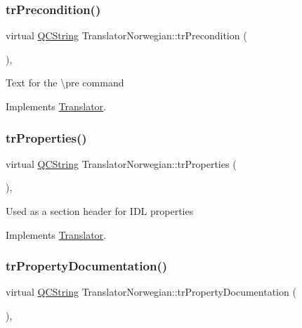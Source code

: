 \subsubsection{\texorpdfstring{trPrecondition()}{trPrecondition()}}
{\footnotesize\ttfamily virtual \mbox{\hyperlink{class_q_c_string}{Q\+C\+String}} Translator\+Norwegian\+::tr\+Precondition (\begin{DoxyParamCaption}{ }\end{DoxyParamCaption})\hspace{0.3cm}{\ttfamily [inline]}, {\ttfamily [virtual]}}

Text for the \textbackslash{}pre command 

Implements \mbox{\hyperlink{class_translator}{Translator}}.

\mbox{\label{class_translator_norwegian_aa2d4c267e5ca84066b1cca221a8cb22d}} 
\subsubsection{\texorpdfstring{trProperties()}{trProperties()}}
{\footnotesize\ttfamily virtual \mbox{\hyperlink{class_q_c_string}{Q\+C\+String}} Translator\+Norwegian\+::tr\+Properties (\begin{DoxyParamCaption}{ }\end{DoxyParamCaption})\hspace{0.3cm}{\ttfamily [inline]}, {\ttfamily [virtual]}}

Used as a section header for I\+DL properties 

Implements \mbox{\hyperlink{class_translator}{Translator}}.

\mbox{\label{class_translator_norwegian_a0ead09cbf04a98fa9e95244ff8264bae}} 
\subsubsection{\texorpdfstring{trPropertyDocumentation()}{trPropertyDocumentation()}}
{\footnotesize\ttfamily virtual \mbox{\hyperlink{class_q_c_string}{Q\+C\+String}} Translator\+Norwegian\+::tr\+Property\+Documentation (\begin{DoxyParamCaption}{ }\end{DoxyParamCaption})\hspace{0.3cm}{\ttfamily [inline]}, {\ttfamily [virtual]}}


